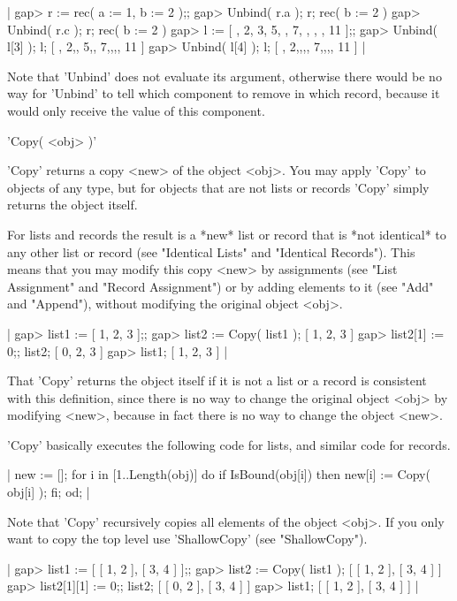 |    gap> r := rec( a := 1, b := 2 );;
    gap> Unbind( r.a );  r;
    rec(
      b := 2 )
    gap> Unbind( r.c );  r;
    rec(
      b := 2 )
    gap> l := [  , 2, 3,  5,  , 7,  ,  ,  , 11 ];;
    gap> Unbind( l[3] );  l;
    [ , 2,, 5,, 7,,,, 11 ]
    gap> Unbind( l[4] );  l;
    [ , 2,,,, 7,,,, 11 ] |

Note that 'Unbind' does not evaluate its argument, otherwise there  would
be no way for 'Unbind' to tell which component to remove in which record,
because it would only receive the value of this component.

%

'Copy( <obj> )'

'Copy' returns a copy <new> of the object <obj>.  You may apply 'Copy' to
objects of any type, but for objects that are not lists or records 'Copy'
simply returns the object itself.

For lists and records  the result is a *new* list or  record that is *not
identical* to  any  other  list  or  record (see  "Identical  Lists"  and
"Identical Records").  This means that you  may modify this copy <new> by
assignments (see "List Assignment" and "Record Assignment") or by  adding
elements to it  (see "Add" and "Append"), without  modifying the original
object <obj>.

|    gap> list1 := [ 1, 2, 3 ];;
    gap> list2 := Copy( list1 );
    [ 1, 2, 3 ]
    gap> list2[1] := 0;;  list2;
    [ 0, 2, 3 ]
    gap> list1;
    [ 1, 2, 3 ] |

That 'Copy' returns the object itself if it is not a  list or a record is
consistent with this definition,  since  there is  no  way to  change the
original object <obj> by modifying <new>, because in fact there is no way
to change the object <new>.

'Copy' basically executes the following code for  lists, and similar code
for records.

|    new := [];
    for i  in [1..Length(obj)]  do
        if IsBound(obj[i])  then
            new[i] := Copy( obj[i] );
        fi;
    od; |

Note that 'Copy' recursively copies all elements of the object <obj>.  If
you    only   want  to   copy the  top    level  use   'ShallowCopy' (see
"ShallowCopy").

|    gap> list1 := [ [ 1, 2 ], [ 3, 4 ] ];;
    gap> list2 := Copy( list1 );
    [ [ 1, 2 ], [ 3, 4 ] ]
    gap> list2[1][1] := 0;;  list2;
    [ [ 0, 2 ], [ 3, 4 ] ]
    gap> list1;
    [ [ 1, 2 ], [ 3, 4 ] ] |

